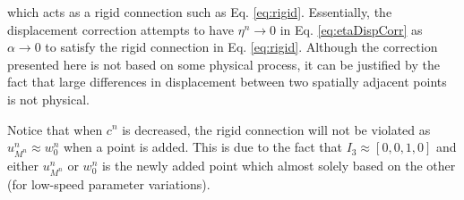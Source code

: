 which acts as a rigid connection such as Eq. \eqref{eq:rigid}. Essentially, the displacement correction attempts to have $\eta^n\rightarrow 0$ in Eq. \eqref{eq:etaDispCorr} as $\alpha \rightarrow 0$ to satisfy the rigid connection in Eq. \eqref{eq:rigid}.
Although the correction presented here is not based on some physical process, it can be justified by the fact that large differences in displacement between two spatially adjacent points is not physical.

Notice that when $c^n$ is decreased, the rigid connection will not be violated as $u_{M^n}^n \approx w_0^n$ when a point is added. This is due to the fact that $I_3\approx [0, 0, 1, 0]$ and either $u_{M^n}^n$ or $w_0^n$ is the newly added point which almost solely based on the other (for low-speed parameter variations).
